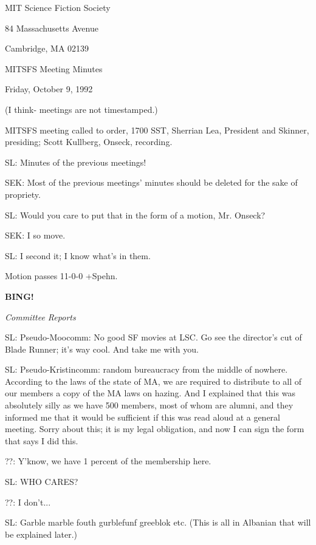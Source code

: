 \documentclass[12pt]{article}
\newcommand{\bing}{{\bf BING!} }
\newcommand{\goto}[1]{\bing \vskip 12pt \centerline{{\em{#1}}}}
\begin{document}
\begin{center}

MIT Science Fiction Society 

84 Massachusetts Avenue

Cambridge, MA 02139

\vspace{12pt}

MITSFS Meeting Minutes 

Friday, October 9, 1992

(I think- meetings are not timestamped.)

\end{center}
 
\vspace{18pt}

\setlength{\parskip}{6pt}

\noindent
MITSFS meeting called to order, 1700 SST,
Sherrian Lea, President and Skinner, presiding; Scott Kullberg, Onseck, recording.

SL: Minutes of the previous meetings!

SEK: Most of the previous meetings' minutes should be deleted for the sake of propriety.

SL: Would you care to put that in the form of a motion, Mr. Onseck?

SEK: I so move.

SL: I second it; I know what's in them.

Motion passes 11-0-0 +Spehn.

\goto{Committee Reports}

SL: Pseudo-Moocomm: No good SF movies at LSC. Go see the director's cut of Blade Runner; it's way cool. And take me with you.

SL: Pseudo-Kristincomm: random bureaucracy from the middle of nowhere. According to the laws of the state of MA, we are required to distribute to all of our members a copy of the MA laws on hazing. And I explained that this was absolutely silly as we have 500 members, most of whom are alumni, and they informed me that it would be sufficient if this was read aloud at a general meeting. Sorry about this; it is my legal obligation, and now I can sign the form that says I did this.

??: Y'know, we have 1 percent of the membership here.

SL: WHO CARES?

??: I don't...

SL: Garble marble fouth gurblefunf greeblok etc. (This is all in Albanian that will be explained later.)
\end{document}
